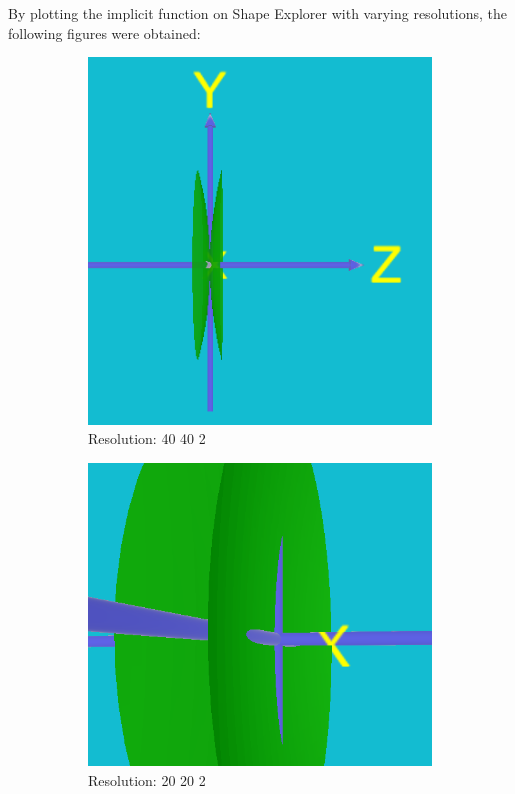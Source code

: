 \documentclass[acmlarge,nonacm=true]{acmart}
\begin{document}
By plotting the implicit function on Shape Explorer with varying resolutions, the following figures were obtained:
\begin{figure}[H]
	\begin{subfigure}{.33\textwidth}
	  \centering
	  \includegraphics[width=.8\linewidth]{fig/1d40_40_2.PNG}
	  \caption{Resolution: 40 40 2}
	\end{subfigure}%
	\begin{subfigure}{.33\textwidth}
	  \centering
	  \includegraphics[width=.8\linewidth]{fig/1d20_20_2.PNG}
	  \caption{Resolution: 20 20 2}
	\end{subfigure}
	\begin{subfigure}{.33\textwidth}

\end{subfigure}
\end{figure}
\end{document}
